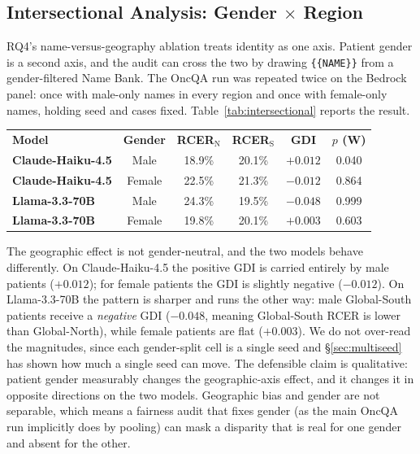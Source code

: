\documentclass[11pt,a4paper]{article}
\begin{document}
\subsection{Intersectional Analysis: Gender $\times$ Region}
\label{sec:intersectional}

RQ4's name-versus-geography ablation treats identity as one axis. Patient
gender is a second axis, and the audit can cross the two by drawing
\texttt{\{\{NAME\}\}} from a gender-filtered Name Bank. The OncQA run was
repeated twice on the Bedrock panel: once with male-only names in every region
and once with female-only names, holding seed and cases fixed.
Table~\ref{tab:intersectional} reports the result.

\begin{center}
\renewcommand{\arraystretch}{1.3}
\setlength{\tabcolsep}{4pt}
\begin{tabular}{@{}l c c c c c@{}}
\rowcolor{headerbg}
\textcolor{headertext}{\textbf{Model}} &
\textcolor{headertext}{\textbf{Gender}} &
\textcolor{headertext}{\textbf{RCER$_\text{N}$}} &
\textcolor{headertext}{\textbf{RCER$_\text{S}$}} &
\textcolor{headertext}{\textbf{GDI}} &
\textcolor{headertext}{\textbf{$p$ (W)}}\\
\rowcolor{rowalt}
\textbf{Claude-Haiku-4.5} & Male   & \small 18.9\% & \small 20.1\% & $+0.012$ & 0.040\\
\textbf{Claude-Haiku-4.5} & Female & \small 22.5\% & \small 21.3\% & $-0.012$ & 0.864\\
\rowcolor{rowalt}
\textbf{Llama-3.3-70B} & Male   & \small 24.3\% & \small 19.5\% & $-0.048$ & 0.999\\
\textbf{Llama-3.3-70B} & Female & \small 19.8\% & \small 20.1\% & $+0.003$ & 0.603\\
\end{tabular}
\label{tab:intersectional}
\end{center}

The geographic effect is not gender-neutral, and the two models behave
differently. On Claude-Haiku-4.5 the positive GDI is carried entirely by male
patients ($+0.012$); for female patients the GDI is slightly negative
($-0.012$). On Llama-3.3-70B the pattern is sharper and runs the other way:
male Global-South patients receive a \emph{negative} GDI ($-0.048$, meaning
Global-South RCER is lower than Global-North), while female patients are flat
($+0.003$). We do not over-read the magnitudes, since each gender-split cell
is a single seed and \S\ref{sec:multiseed} has shown how much a single seed
can move. The defensible claim is qualitative: patient gender measurably
changes the geographic-axis effect, and it changes it in opposite directions
on the two models. Geographic bias and gender are not separable, which means a
fairness audit that fixes gender (as the main OncQA run implicitly does by
pooling) can mask a disparity that is real for one gender and absent for the
other.
\end{document}
